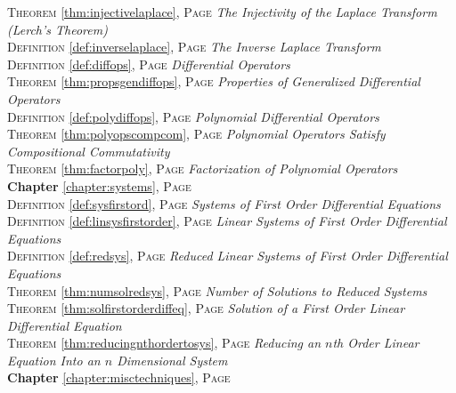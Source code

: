 \begin{multicols}{2}
{\textsc{Theorem} \ref{thm:injectivelaplace}, \textsc{Page} \pageref{thm:injectivelaplace} \textit{The Injectivity of the Laplace Transform (Lerch's Theorem)} \\
\textsc{Definition} \ref{def:inverselaplace}, \textsc{Page} \pageref{def:inverselaplace} \textit{The Inverse Laplace Transform} \\
\textsc{Definition} \ref{def:diffops}, \textsc{Page} \pageref{def:diffops} \textit{Differential Operators} \\
\textsc{Theorem} \ref{thm:propsgendiffops}, \textsc{Page} \pageref{thm:propsgendiffops} \textit{Properties of Generalized Differential Operators} \\
\textsc{Definition} \ref{def:polydiffops}, \textsc{Page} \pageref{def:polydiffops} \textit{Polynomial Differential Operators} \\
\textsc{Theorem} \ref{thm:polyopscompcom}, \textsc{Page} \pageref{thm:polyopscompcom} \textit{Polynomial Operators Satisfy Compositional Commutativity} \\
\textsc{Theorem} \ref{thm:factorpoly}, \textsc{Page} \pageref{thm:factorpoly} \textit{Factorization of Polynomial Operators} \\
\textbf{Chapter} \ref{chapter:systems}, \textsc{Page} \pageref{chapter:systems} \\
\textsc{Definition} \ref{def:sysfirstord}, \textsc{Page} \pageref{def:sysfirstord} \textit{Systems of First Order Differential Equations} \\
\textsc{Definition} \ref{def:linsysfirstorder}, \textsc{Page} \pageref{def:linsysfirstorder} \textit{Linear Systems of First Order Differential Equations} \\
\textsc{Definition} \ref{def:redsys}, \textsc{Page} \pageref{def:redsys} \textit{Reduced Linear Systems of First Order Differential Equations} \\
\textsc{Theorem} \ref{thm:numsolredsys}, \textsc{Page} \pageref{thm:numsolredsys} \textit{Number of Solutions to Reduced Systems} \\
\textsc{Theorem} \ref{thm:solfirstorderdiffeq}, \textsc{Page} \pageref{thm:solfirstorderdiffeq} \textit{Solution of a First Order Linear Differential Equation} \\
\textsc{Theorem} \ref{thm:reducingnthordertosys}, \textsc{Page} \pageref{thm:reducingnthordertosys} \textit{Reducing an \(n\)th Order Linear Equation Into an \(n\) Dimensional System} \\
\textbf{Chapter} \ref{chapter:misctechniques}, \textsc{Page} \pageref{chapter:misctechniques} \\
}
\end{multicols}
